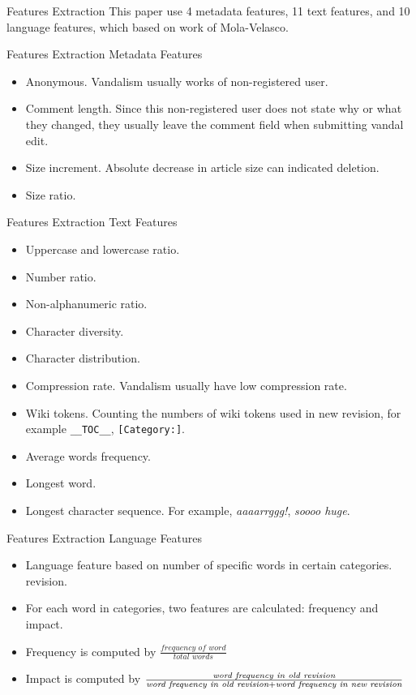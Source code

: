 \documentclass{beamer}
\begin{document}
\begin{frame}{Features Extraction}
This paper use 4 metadata features, 11 text features, and 10 language features,
which based on work of Mola-Velasco.
\end{frame}

\begin{frame}
	{Features Extraction}
	{Metadata Features}
	\begin{itemize}
		\item Anonymous. Vandalism usually works of non-registered user.
		\item Comment length. Since this non-registered user does not state why
		or what they changed, they usually leave the comment field when
		submitting vandal edit.
		\item Size increment. Absolute decrease in article size can indicated
		deletion.
		\item Size ratio.
	\end{itemize}
\end{frame}

\begin{frame}
	{Features Extraction}
	{Text Features}
	\begin{itemize}
		\item Uppercase and lowercase ratio.
		\item Number ratio.
		\item Non-alphanumeric ratio.
		\item Character diversity.
		\item Character distribution.
		\item Compression rate. Vandalism usually have low compression rate.
		\item Wiki tokens. Counting the numbers of wiki tokens used in new
		revision, for example \texttt{\_\_TOC\_\_}, \texttt{[Category:]}.
		\item Average words frequency.
		\item Longest word.
		\item Longest character sequence. For example, \textit{aaaarrggg!},
		\textit{soooo huge}.
	\end{itemize}
\end{frame}

\begin{frame}
	{Features Extraction}
	{Language Features}
	\begin{itemize}
		\item Language feature based on number of specific words in certain
		categories.
		revision.
		\item For each word in categories, two features are calculated:
		frequency and impact.
		\item Frequency is computed by $\frac{\textit{frequency of
		word}}{\textit{total words}}$
		\item Impact is computed by $\frac{%
				\textit{word frequency in old revision}
			}{
			\textit{word frequency in old revision}
				+ \textit{word frequency in new revision}
			} $
	\end{itemize}
\end{frame}
\end{document}
